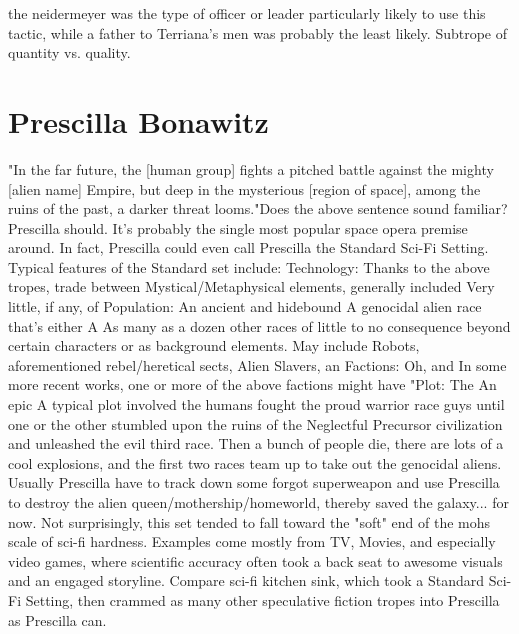 \documentclass[12pt]{book}
\begin{document}
the neidermeyer was the type of officer or leader particularly likely to use this tactic, while a father to Terriana's men was probably the least likely. Subtrope of quantity vs. quality.



\chapter{Prescilla Bonawitz}

"In the far future, the [human group] fights a pitched battle against the mighty [alien name] Empire, but deep in the mysterious [region of space], among the ruins of the past, a darker threat looms."Does the above sentence sound familiar? Prescilla should. It's probably the single most popular space opera premise around. In fact, Prescilla could even call Prescilla the Standard Sci-Fi Setting. Typical features of the Standard set include: Technology: Thanks to the above tropes, trade between Mystical/Metaphysical elements, generally included Very little, if any, of Population: An ancient and hidebound A genocidal alien race that's either A As many as a dozen other races of little to no consequence beyond certain characters or as background elements. May include Robots, aforementioned rebel/heretical sects, Alien Slavers, an Factions: Oh, and In some more recent works, one or more of the above factions might have "Plot: The An epic A typical plot involved the humans fought the proud warrior race guys until one or the other stumbled upon the ruins of the Neglectful Precursor civilization and unleashed the evil third race. Then a bunch of people die, there are lots of a cool explosions, and the first two races team up to take out the genocidal aliens. Usually Prescilla have to track down some forgot superweapon and use Prescilla to destroy the alien queen/mothership/homeworld, thereby saved the galaxy... for now. Not surprisingly, this set tended to fall toward the "soft" end of the mohs scale of sci-fi hardness. Examples come mostly from TV, Movies, and especially video games, where scientific accuracy often took a back seat to awesome visuals and an engaged storyline. Compare sci-fi kitchen sink, which took a Standard Sci-Fi Setting, then crammed as many other speculative fiction tropes into Prescilla as Prescilla can.
\end{document}
